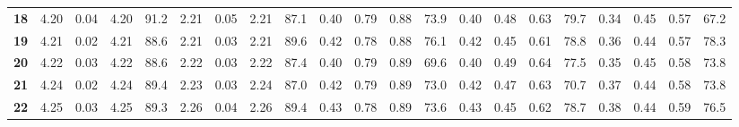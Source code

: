 \begin{tabular}{l|rrrr|rrrr|rrrr|rrrr|rrrr}
	\textbf{18 } &                     4.20 &                  0.04 &          4.20 &                  91.2 &                     2.21 &                  0.05 &          2.21 &                  87.1 &                     0.40 &                  0.79 &          0.88 &                  73.9 &                     0.40 &                  0.48 &          0.63 &                  79.7 &                     0.34 &                  0.45 &          0.57 &                  67.2 \\
	\textbf{19 } &                     4.21 &                  0.02 &          4.21 &                  88.6 &                     2.21 &                  0.03 &          2.21 &                  89.6 &                     0.42 &                  0.78 &          0.88 &                  76.1 &                     0.42 &                  0.45 &          0.61 &                  78.8 &                     0.36 &                  0.44 &          0.57 &                  78.3 \\
	\textbf{20 } &                     4.22 &                  0.03 &          4.22 &                  88.6 &                     2.22 &                  0.03 &          2.22 &                  87.4 &                     0.40 &                  0.79 &          0.89 &                  69.6 &                     0.40 &                  0.49 &          0.64 &                  77.5 &                     0.35 &                  0.45 &          0.58 &                  73.8 \\
	\textbf{21 } &                     4.24 &                  0.02 &          4.24 &                  89.4 &                     2.23 &                  0.03 &          2.24 &                  87.0 &                     0.42 &                  0.79 &          0.89 &                  73.0 &                     0.42 &                  0.47 &          0.63 &                  70.7 &                     0.37 &                  0.44 &          0.58 &                  73.8 \\
	\textbf{22 } &                     4.25 &                  0.03 &          4.25 &                  89.3 &                     2.26 &                  0.04 &          2.26 &                  89.4 &                     0.43 &                  0.78 &          0.89 &                  73.6 &                     0.43 &                  0.45 &          0.62 &                  78.7 &                     0.38 &                  0.44 &          0.59 &                  76.5 \\
	\bottomrule
\end{tabular}
